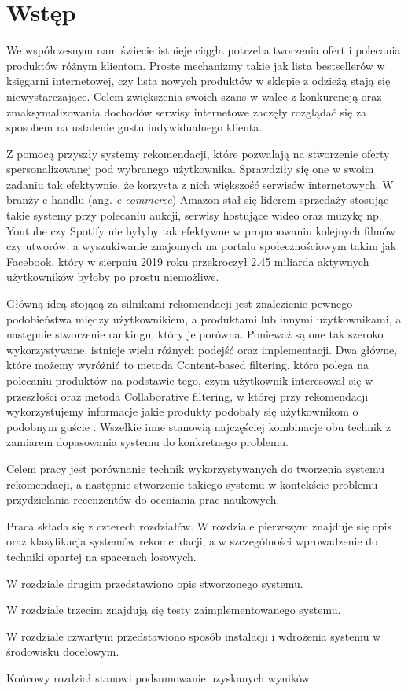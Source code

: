 \chapter{Wstęp}
\thispagestyle{chapterBeginStyle}

We współczesnym nam świecie istnieje ciągła potrzeba tworzenia ofert i polecania produktów różnym klientom. Proste mechanizmy takie jak lista bestsellerów w księgarni internetowej, czy lista nowych produktów w sklepie z odzieżą stają się niewystarczające. Celem zwiększenia swoich szans w walce z konkurencją oraz zmaksymalizowania dochodów serwisy internetowe zaczęły rozglądać się za sposobem na ustalenie gustu indywidualnego klienta.

Z pomocą przyszły systemy rekomendacji, które pozwalają na stworzenie oferty spersonalizowanej pod wybranego użytkownika. Sprawdziły się one w swoim zadaniu tak efektywnie, że korzysta z nich większość serwisów internetowych. W branży e-handlu (ang. \textit{e-commerce}) Amazon stał się liderem sprzedaży stosując takie systemy przy polecaniu aukcji, serwisy hostujące wideo oraz muzykę np. Youtube czy Spotify nie byłyby tak efektywne w proponowaniu kolejnych filmów czy utworów, a wyszukiwanie znajomych na portalu społecznościowym takim jak Facebook, który w sierpniu 2019 roku przekroczył 2.45 miliarda aktywnych użytkowników \cite{facebook} byłoby po prostu niemożliwe.

Główną ideą stojącą za silnikami rekomendacji jest znalezienie pewnego podobieństwa między użytkownikiem, a produktami lub innymi użytkownikami, a następnie stworzenie rankingu, który je porówna. Ponieważ są one tak szeroko wykorzystywane, istnieje wielu różnych podejść oraz implementacji. Dwa główne, które możemy wyróżnić to metoda Content-based filtering, która polega na polecaniu produktów na podstawie tego, czym użytkownik interesował się w przeszłości oraz metoda Collaborative filtering, w której przy rekomendacji wykorzystujemy informacje jakie produkty podobały się użytkownikom o podobnym guście \cite{RecommenderASurvey}. Wszelkie inne stanowią najczęściej kombinacje obu technik z zamiarem dopasowania systemu do konkretnego problemu.

Celem pracy jest porównanie technik wykorzystywanych do tworzenia systemu rekomendacji, a następnie stworzenie takiego systemu 
w kontekście problemu przydzielania recenzentów do oceniania prac naukowych.

Praca składa się z czterech rozdziałów.
W rozdziale pierwszym znajduje się opis oraz klasyfikacja systemów rekomendacji, 
a w szczególności wprowadzenie do techniki opartej na spacerach losowych.


W rozdziale drugim przedstawiono opis stworzonego systemu.

W rozdziale trzecim znajdują się testy zaimplementowanego systemu.

W rozdziale czwartym przedstawiono sposób instalacji i wdrożenia systemu w środowisku docelowym.

Końcowy rozdział stanowi podsumowanie uzyskanych wyników.